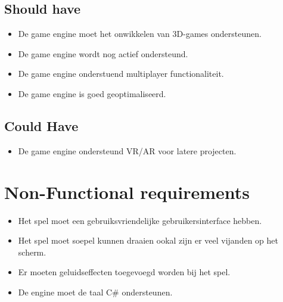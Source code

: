 \subsection{Should have}
\begin{itemize}
    \item De game engine moet het onwikkelen van 3D-games ondersteunen.
    \item De game engine wordt nog actief ondersteund.
    \item De game engine onderstuend multiplayer functionaliteit.
    \item De game engine is goed geoptimaliseerd.
\end{itemize}

\subsection{Could Have}
\begin{itemize}
    \item De game engine ondersteund VR/AR voor latere projecten.
\end{itemize}

\section{Non-Functional requirements}
\begin{itemize}
    \item Het spel moet een gebruiksvriendelijke gebruikersinterface hebben. 
    \item Het spel moet soepel kunnen draaien ookal zijn er veel vijanden op het scherm. 
    \item Er moeten geluidseffecten toegevoegd worden bij het spel.
    \item De engine moet de taal C\# ondersteunen.
\end{itemize}
